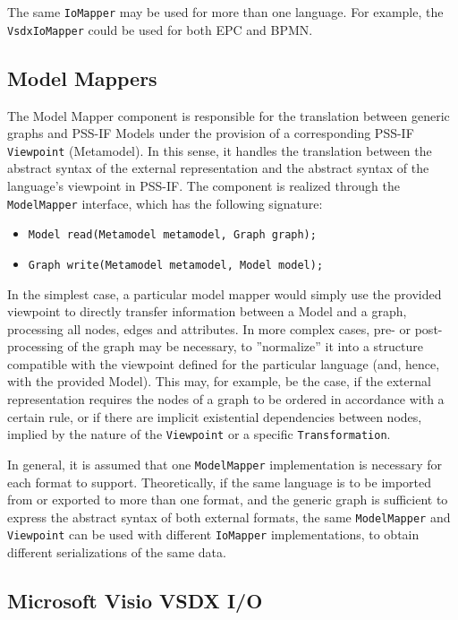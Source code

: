 The same \texttt{IoMapper} may be used for more than one language. For example, the \texttt{VsdxIoMapper} could be used for both EPC and BPMN.

\subsection{Model Mappers}
\label{sec:impl:comp:model}

The Model Mapper component is responsible for the translation between generic graphs and PSS-IF Models under the provision of a corresponding PSS-IF \texttt{Viewpoint} (Metamodel). In this sense, it handles the translation between the abstract syntax of the external representation and the abstract syntax of the language's viewpoint in PSS-IF. The component is realized through the \texttt{ModelMapper} interface, which has the following signature:

\begin{itemize}
\item \texttt{Model read(Metamodel metamodel, Graph graph);}
\item \texttt{Graph write(Metamodel metamodel, Model model);}
\end{itemize}

In the simplest case, a particular model mapper would simply use the provided viewpoint to directly transfer information between a Model and a graph, processing all nodes, edges and attributes. In more complex cases, pre- or post-processing of the graph may be necessary, to ''normalize'' it into a structure compatible with the viewpoint defined for the particular language (and, hence, with the provided Model). This may, for example, be the case, if the external representation requires the nodes of a graph to be ordered in accordance with a certain rule, or if there are implicit existential dependencies between nodes, implied by the nature of the \texttt{Viewpoint} or a specific \texttt{Transformation}.

In general, it is assumed that one \texttt{ModelMapper} implementation is necessary for each format to support. Theoretically, if the same language is to be imported from or exported to more than one format, and the generic graph is sufficient to express the abstract syntax of both external formats, the same \texttt{ModelMapper} and \texttt{Viewpoint} can be used with different \texttt{IoMapper} implementations, to obtain different serializations of the same data.

\subsection{Microsoft Visio VSDX I/O}

